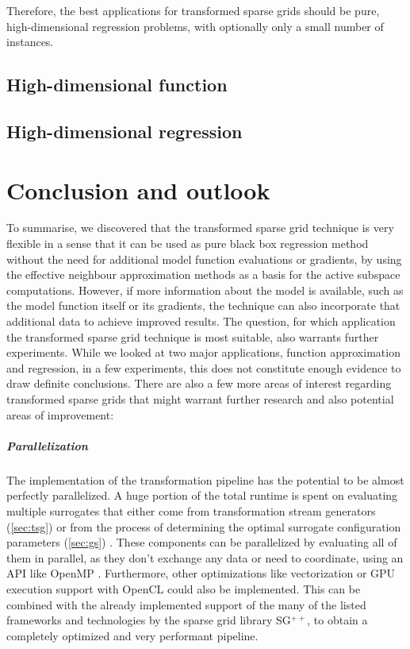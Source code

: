 \documentclass[
  a4paper,  %
  twoside,  %
  bibliography=totoc,
  headsepline,
  cleardoublepage=empty,
  parskip=half,
  draft=false
]{scrbook}
\begin{document}
Therefore, the best applications for transformed sparse grids should be pure, high-dimensional regression problems, with optionally only a small number of instances.




\section{High-dimensional function}
\section{High-dimensional regression}

\chapter{Conclusion and outlook}
\label{chap:c9}

To summarise, we discovered that the transformed sparse grid technique is very flexible in a sense that it can be used as pure black box regression method without the need for additional model function evaluations or gradients, by using the effective neighbour approximation methods as a basis for the active subspace computations.
However, if more information about the model is available, such as the model function itself or its gradients, the technique can also incorporate that additional data to achieve improved results.
The question, for which application the transformed sparse grid technique is most suitable, also warrants further experiments.
While we looked at two major applications, function approximation and regression, in a few experiments, this does not constitute enough evidence to draw definite conclusions.
There are also a few more areas of interest regarding transformed sparse grids that might warrant further research and also potential areas of improvement:

\paragraph{Parallelization}
The implementation of the transformation pipeline has the potential to be almost perfectly parallelized.
A huge portion of the total runtime is spent on evaluating multiple surrogates that either come from transformation stream generators (\cref{sec:tsg}) or from the process of determining the optimal surrogate configuration parameters (\cref{sec:gs}) .
These components can be parallelized by evaluating all of them in parallel, as they don't exchange any data or need to coordinate, using an API like OpenMP \cite{openmp08}.
Furthermore, other optimizations like vectorization \cite{Maleki2011} or GPU execution support with OpenCL \cite{Stone2010} could also be implemented.
This can be combined with the already implemented support of the many of the listed frameworks and technologies by the sparse grid library SG$^{++}$, to obtain a completely optimized and very performant pipeline.
\end{document}
